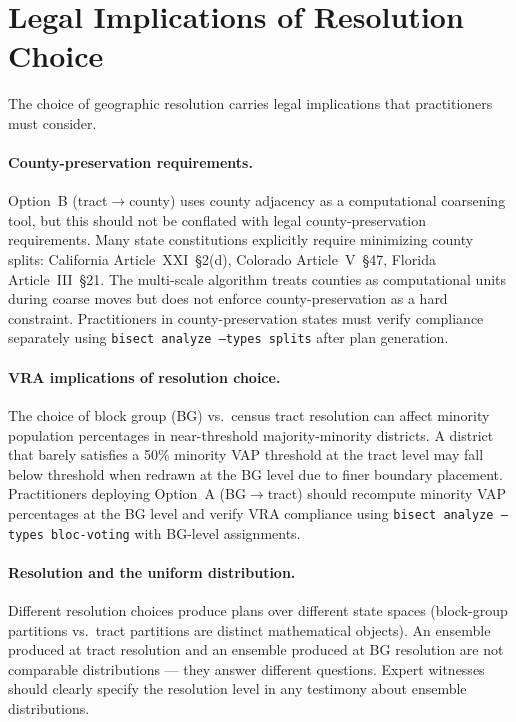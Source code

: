\section{Legal Implications of Resolution Choice}
\label{sec:legal}

The choice of geographic resolution carries legal implications that practitioners must consider.

\paragraph{County-preservation requirements.}
Option~B (tract$\to$county) uses county adjacency as a computational coarsening tool,
but this should not be conflated with legal county-preservation requirements.
Many state constitutions explicitly require minimizing county splits:
California Article~XXI~\S2(d), Colorado Article~V~\S47, Florida Article~III~\S21.
The multi-scale algorithm treats counties as computational units during coarse moves
but does not enforce county-preservation as a hard constraint.
Practitioners in county-preservation states must verify compliance separately using
\texttt{bisect analyze --types splits} after plan generation.

\paragraph{VRA implications of resolution choice.}
The choice of block group (BG) vs.\ census tract resolution can affect minority
population percentages in near-threshold majority-minority districts.
A district that barely satisfies a 50\% minority VAP threshold at the tract level
may fall below threshold when redrawn at the BG level due to finer boundary placement.
Practitioners deploying Option~A (BG$\to$tract) should recompute minority VAP
percentages at the BG level and verify VRA compliance using
\texttt{bisect analyze --types bloc-voting} with BG-level assignments.

\paragraph{Resolution and the uniform distribution.}
Different resolution choices produce plans over different state spaces
(block-group partitions vs.\ tract partitions are distinct mathematical objects).
An ensemble produced at tract resolution and an ensemble produced at BG resolution
are not comparable distributions --- they answer different questions.
Expert witnesses should clearly specify the resolution level in any testimony
about ensemble distributions.
